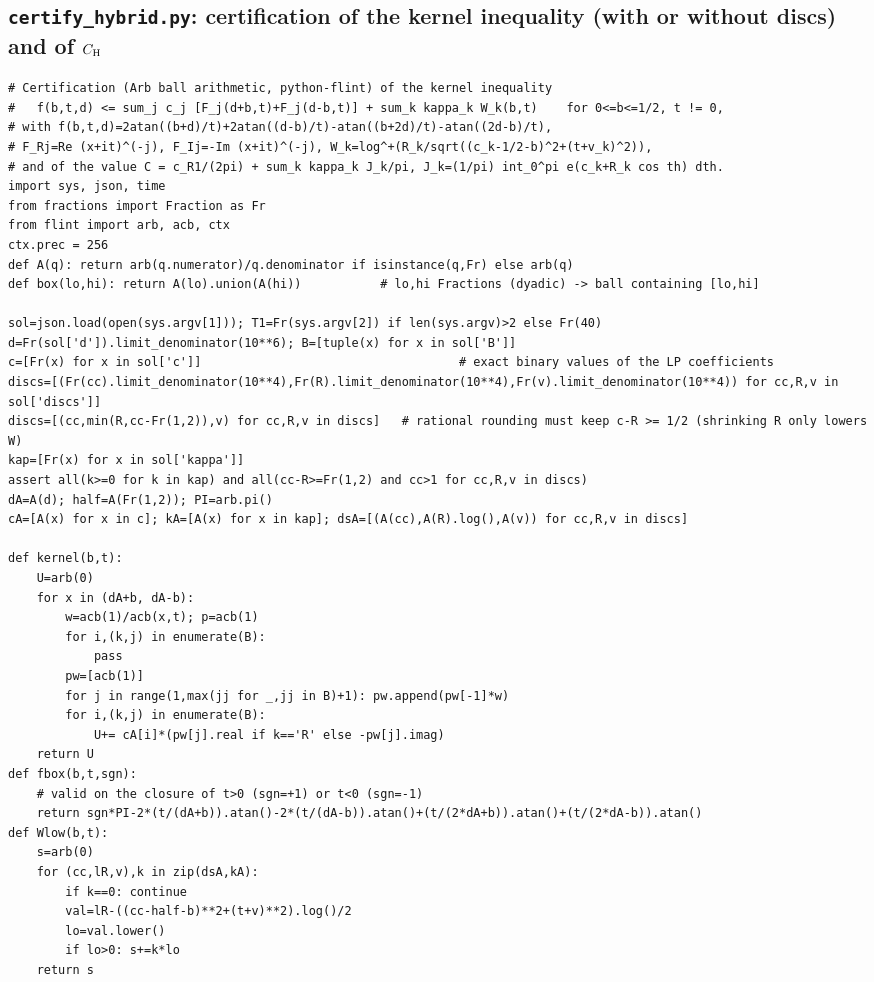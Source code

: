 \documentclass[11pt,reqno]{amsart}
\numberwithin{equation}{section}
\theoremstyle{definition}
\theoremstyle{remark}
\begin{document}
\subsection*{\texttt{certify\_hybrid.py}: certification of the kernel inequality (with or without discs) and of $C_{\rm H}$}
\label{app:cert_hybrid}
\begin{lstlisting}
# Certification (Arb ball arithmetic, python-flint) of the kernel inequality
#   f(b,t,d) <= sum_j c_j [F_j(d+b,t)+F_j(d-b,t)] + sum_k kappa_k W_k(b,t)    for 0<=b<=1/2, t != 0,
# with f(b,t,d)=2atan((b+d)/t)+2atan((d-b)/t)-atan((b+2d)/t)-atan((2d-b)/t),
# F_Rj=Re (x+it)^(-j), F_Ij=-Im (x+it)^(-j), W_k=log^+(R_k/sqrt((c_k-1/2-b)^2+(t+v_k)^2)),
# and of the value C = c_R1/(2pi) + sum_k kappa_k J_k/pi, J_k=(1/pi) int_0^pi e(c_k+R_k cos th) dth.
import sys, json, time
from fractions import Fraction as Fr
from flint import arb, acb, ctx
ctx.prec = 256
def A(q): return arb(q.numerator)/q.denominator if isinstance(q,Fr) else arb(q)
def box(lo,hi): return A(lo).union(A(hi))           # lo,hi Fractions (dyadic) -> ball containing [lo,hi]

sol=json.load(open(sys.argv[1])); T1=Fr(sys.argv[2]) if len(sys.argv)>2 else Fr(40)
d=Fr(sol['d']).limit_denominator(10**6); B=[tuple(x) for x in sol['B']]
c=[Fr(x) for x in sol['c']]                                    # exact binary values of the LP coefficients
discs=[(Fr(cc).limit_denominator(10**4),Fr(R).limit_denominator(10**4),Fr(v).limit_denominator(10**4)) for cc,R,v in sol['discs']]
discs=[(cc,min(R,cc-Fr(1,2)),v) for cc,R,v in discs]   # rational rounding must keep c-R >= 1/2 (shrinking R only lowers W)
kap=[Fr(x) for x in sol['kappa']]
assert all(k>=0 for k in kap) and all(cc-R>=Fr(1,2) and cc>1 for cc,R,v in discs)
dA=A(d); half=A(Fr(1,2)); PI=arb.pi()
cA=[A(x) for x in c]; kA=[A(x) for x in kap]; dsA=[(A(cc),A(R).log(),A(v)) for cc,R,v in discs]

def kernel(b,t):
    U=arb(0)
    for x in (dA+b, dA-b):
        w=acb(1)/acb(x,t); p=acb(1)
        for i,(k,j) in enumerate(B):
            pass
        pw=[acb(1)]
        for j in range(1,max(jj for _,jj in B)+1): pw.append(pw[-1]*w)
        for i,(k,j) in enumerate(B):
            U+= cA[i]*(pw[j].real if k=='R' else -pw[j].imag)
    return U
def fbox(b,t,sgn):
    # valid on the closure of t>0 (sgn=+1) or t<0 (sgn=-1)
    return sgn*PI-2*(t/(dA+b)).atan()-2*(t/(dA-b)).atan()+(t/(2*dA+b)).atan()+(t/(2*dA-b)).atan()
def Wlow(b,t):
    s=arb(0)
    for (cc,lR,v),k in zip(dsA,kA):
        if k==0: continue
        val=lR-((cc-half-b)**2+(t+v)**2).log()/2
        lo=val.lower()
        if lo>0: s+=k*lo
    return s


\end{lstlisting}
\end{document}

